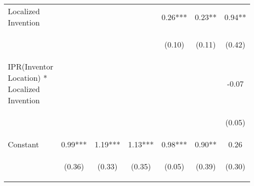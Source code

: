 \begin{center}
\begin{tabular}{lcccccc}
Localized Invention &  &  &  & 0.26*** & 0.23** & 0.94** \\
\vspace{4pt} & \begin{footnotesize}\end{footnotesize} & \begin{footnotesize}\end{footnotesize} & \begin{footnotesize}\end{footnotesize} & \begin{footnotesize}(0.10)\end{footnotesize} & \begin{footnotesize}(0.11)\end{footnotesize} & \begin{footnotesize}(0.42)\end{footnotesize} \\
IPR(Inventor Location) * Localized Invention &  &  &  &  &  & -0.07 \\
\vspace{4pt} & \begin{footnotesize}\end{footnotesize} & \begin{footnotesize}\end{footnotesize} & \begin{footnotesize}\end{footnotesize} & \begin{footnotesize}\end{footnotesize} & \begin{footnotesize}\end{footnotesize} & \begin{footnotesize}(0.05)\end{footnotesize} \\
Constant & 0.99*** & 1.19*** & 1.13*** & 0.98*** & 0.90** & 0.26 \\
 & \begin{footnotesize}(0.36)\end{footnotesize} & \begin{footnotesize}(0.33)\end{footnotesize} & \begin{footnotesize}(0.35)\end{footnotesize} & \begin{footnotesize}(0.05)\end{footnotesize} & \begin{footnotesize}(0.39)\end{footnotesize} & \begin{footnotesize}(0.30)\end{footnotesize} \\

\end{tabular}
\end{center}
